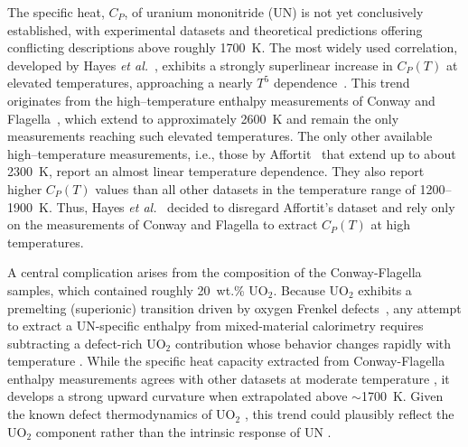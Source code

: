 \documentclass[preprint,12pt,sort&compress]{elsarticle}
\newcommand{\?}{\stackrel{?}{=}}
\begin{document}
The specific heat, $C_P$, of uranium mononitride (UN) is not yet conclusively established, with experimental datasets and theoretical predictions offering conflicting descriptions above roughly 1700~K. The most widely used correlation, developed by Hayes \textit{et al.}~\cite{Hayes1990IV}, exhibits a strongly superlinear increase in $C_P(T)$ at elevated temperatures, approaching a nearly $T^{5}$ dependence~\cite{AbdulHameed2024}. This trend originates from the high–temperature enthalpy measurements of Conway and Flagella~\cite{Conway1969}, which extend to approximately 2600~K and remain the only measurements reaching such elevated temperatures. The only other available high–temperature measurements, i.e., those by Affortit~\cite{Affortit1970} that extend up to about 2300~K, report an almost linear temperature dependence. They also report higher $C_P(T)$ values than all other datasets in the temperature range of 1200--1900~K. Thus, Hayes \textit{et al.}~\cite{Hayes1990IV} decided to disregard Affortit's dataset and rely only on the measurements of Conway and Flagella to extract $C_P(T)$ at high temperatures. %

A central complication arises from the composition of the Conway-Flagella samples, which contained roughly 20~wt.\% UO$_2$. Because UO$_2$ exhibits a premelting (superionic) transition driven by oxygen Frenkel defects~\cite{Pavlov2017,Cooper2014}, any attempt to extract a UN-specific enthalpy from mixed-material calorimetry requires subtracting a defect-rich UO$_2$ contribution whose behavior changes rapidly with temperature \cite{Hayes1990IV}. While the specific heat capacity extracted from Conway-Flagella enthalpy measurements agrees with other datasets at moderate temperature \cite{Hayes1990IV}, it develops a strong upward curvature when extrapolated above $\sim$1700~K. Given the known defect thermodynamics of UO$_2$ \cite{Pavlov2017,Cooper2014}, this trend could plausibly reflect the UO$_2$ component rather than the intrinsic response of UN \cite{Galvin2023}.
\end{document}

